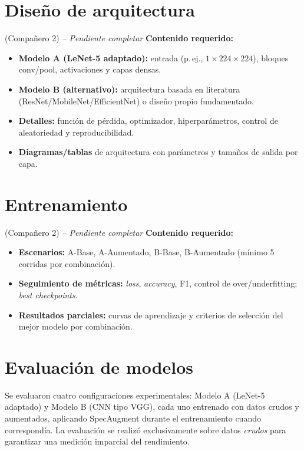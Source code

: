 \documentclass[conference]{IEEEtran}
\begin{document}
\section{Diseño de arquitectura}
\label{sec:arquitectura}
(Compañero 2) \textit{-- Pendiente completar}
\noindent\textbf{Contenido requerido:}
\begin{itemize}
    \item \textbf{Modelo A (LeNet-5 adaptado):} entrada (p.\,ej., $1\times224\times224$), bloques conv/pool, activaciones y capas densas.
    \item \textbf{Modelo B (alternativo):} arquitectura basada en literatura (ResNet/MobileNet/EfficientNet) o diseño propio fundamentado.
    \item \textbf{Detalles:} función de pérdida, optimizador, hiperparámetros, control de aleatoriedad y reproducibilidad.
    \item \textbf{Diagramas/tablas} de arquitectura con parámetros y tamaños de salida por capa.
\end{itemize}

\section{Entrenamiento}
\label{sec:entrenamiento}
(Compañero 2) \textit{-- Pendiente completar}
\noindent\textbf{Contenido requerido:}
\begin{itemize}
    \item \textbf{Escenarios:} A-Base, A-Aumentado, B-Base, B-Aumentado (mínimo 5 corridas por combinación).
    \item \textbf{Seguimiento de métricas:} \emph{loss}, \emph{accuracy}, F1, control de over/underfitting; \emph{best checkpoints}.
    \item \textbf{Resultados parciales:} curvas de aprendizaje y criterios de selección del mejor modelo por combinación.
\end{itemize}

\section{Evaluación de modelos}
\label{sec:evaluacion}

Se evaluaron cuatro configuraciones experimentales: Modelo A (LeNet-5 adaptado) y Modelo B (CNN tipo VGG), cada uno entrenado con datos crudos y aumentados, aplicando SpecAugment durante el entrenamiento cuando correspondía. La evaluación se realizó exclusivamente sobre datos \emph{crudos} para garantizar una medición imparcial del rendimiento.
\end{document}
